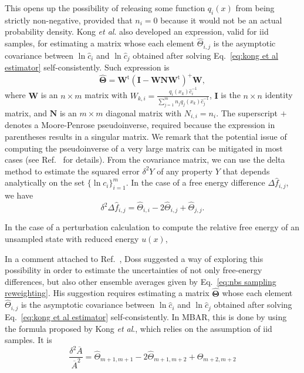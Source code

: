 \documentclass[aip,jcp,reprint,amsmath,amssymb]{revtex4-1}
\newcommand{\mt}[1]{\boldsymbol{\mathbf{#1}}}           %
\newcommand{\tr}[1]{#1^\text{t}}                        %
\begin{document}
This opens up the possibility of releasing some function $q_i(x)$ from being strictly non-negative, provided that $n_i = 0$ because it would not be an actual probability density. Kong \textit{et al}.\cite{Kong_2003} also developed an expression, valid for iid samples, for estimating a matrix whose each element $\hat \Theta_{i,j}$ is the asymptotic covariance between $\ln \hat c_i$ and $\ln \hat c_j$ obtained after solving Eq.~\eqref{eq:kong et al estimator} self-consistently. Such expression is
\begin{equation}
\label{eq:mbar covariance matrix}
\hat{\mt \Theta} = \tr{\mt W}(\mt I - {\mt W}{\mt N}\tr{\mt W})^+{\mt W},
\end{equation}
where $\mt W$ is an $n \times m$ matrix with $W_{k,i} = \frac{q_i(x_k) \hat c_i^{-1}}{\sum_{j=1}^m n_j q_j(x_k) \hat c_j^{-1}}$, $\mt I$ is the $n \times n$ identity matrix, and $\mt N$ is an $m \times m$ diagonal matrix with $N_{i,i} = n_i$. The superscript $+$ denotes a Moore-Penrose pseudoinverse, required because the expression in parentheses results in a singular matrix. We remark that the potential issue of computing the pseudoinverse of a very large matrix can be mitigated in most cases (see Ref.~ for details). From the covariance matrix, we can use the delta method\cite{Greene_2012} to estimate the squared error $\delta^2 Y$ of any property $Y$ that depends analytically on the set $\{\ln c_i\}_{i=1}^m$. In the case of a free energy difference $\Delta \hat f_{i,j}$, we have
\begin{equation}
\label{eq:mbar free mean-square error}
\delta^2 \Delta {\hat f_{i,j}} = {\hat \Theta}_{i,i} - 2 {\hat \Theta}_{i,j} + {\hat \Theta}_{j,j}.
\end{equation}

In the case of a perturbation calculation to compute the relative free energy of an unsampled state with reduced energy $u(x)$,

In a comment attached to Ref.~, Doss suggested a way of exploring this possibility in order to estimate the uncertainties of not only free-energy differences, but also other ensemble averages given by Eq.~\eqref{eq:nbs sampling reweighting}. His suggestion requires estimating a matrix $\hat {\mt \Theta}$ whose each element $\hat \Theta_{i,j}$ is the asymptotic covariance between $\ln \hat c_i$ and $\ln \hat c_j$ obtained after solving Eq.~\eqref{eq:kong et al estimator} self-consistently. In MBAR, this is done by using the formula proposed by Kong \textit{et al}.,\cite{Kong_2003} which relies on the assumption of iid samples. It is
\begin{equation*}
\frac{\delta^2 \overline A}{\overline A^2} = {\hat \Theta}_{m+1,m+1} - 2 {\hat \Theta}_{m+1,m+2} + {\hat \Theta}_{m+2,m+2}
\end{equation*}
\end{document}

